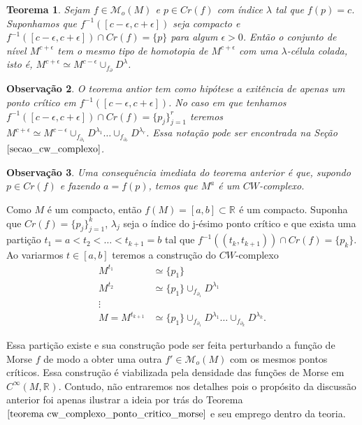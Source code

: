 \documentclass[12pt]{book}
\newtheorem{teorema}{Teorema}[section]
\newtheorem{observacao}[teorema]{Observação}
\newcommand{\funcoesmorse}[1]{\mathcal{M}_{o}(#1)}
\newcommand{\funcoessuaves}[1]{C^{\infty}(#1, \real{})}
\newcommand{\pontoscriticos}[1]{\textit{Cr}(#1)}
\newcommand{\real}[1]{\mathbb{R}^{#1}}
\newcommand{\reta}{\real{}}
\begin{document}
	\begin{teorema}\label{teorema cw_complexo_ponto_critico_morse}
		Sejam $f\in \funcoesmorse{M}$ e $p\in \pontoscriticos{f}$ com índice $\lambda$ tal que $f(p) = c$. Suponhamos que $f^{-1}([c-\epsilon,c+\epsilon])$ seja compacto e $f^{-1}([c-\epsilon,c+\epsilon])\cap \pontoscriticos{f} = \{p\}$ para algum $\epsilon>0$. Então o conjunto de nível $M^{c+\epsilon}$ tem o mesmo tipo de homotopia de $M^{c+\epsilon}$ com uma $\lambda$-célula colada, isto é, $M^{c+\epsilon} \simeq M^{c-\epsilon}\cup_{f_{\partial}} D^{\lambda}$.
	\end{teorema}
	
	\begin{observacao}
		O teorema antior tem como hipótese a exitência de apenas um ponto crítico em $f^{-1}([c-\epsilon,c+\epsilon])$. No caso em que tenhamos $f^{-1}([c-\epsilon,c+\epsilon]) \cap \pontoscriticos{f} = \{p_{j}\}_{j=1}^{r}$ teremos $M^{c+\epsilon} \simeq M^{c-\epsilon}\cup_{f_{\partial_{1}}} D^{\lambda_{1}}\dots  \cup_{f_{\partial_{r}}} D^{\lambda_{r}}$. Essa notação pode ser encontrada na Seção $\ref{secao_cw_complexo}$.
	\end{observacao}
	
	\begin{observacao}
		Uma consequência imediata do teorema anterior é que, supondo $p \in \pontoscriticos{f}$ e fazendo $a = f(p)$, temos que $M^{a}$ é um $CW$-complexo. 
	\end{observacao}
	
	Como $M$ é um compacto, então $f(M) = [a,b] \subset \reta$ é um compacto. Suponha que $\pontoscriticos{f} = \{p_{j}\}_{j=1}^{k}$, $\lambda_{j}$ seja o índice do j-ésimo ponto crítico e que exista uma partição $t_{1} = a < t_{2}< \dots< t_{k+1} = b$ tal que $f^{-1}((t_{k}, t_{k+1})) \cap \pontoscriticos{f} = \{p_{k}\}$. Ao variarmos $t \in [a,b]$ teremos a construção do $CW$-complexo
	$$
	\begin{aligned}
	M^{t_{1}} &\simeq \{p_{1}\}
	\\
	M^{t_{2}} & \simeq \{p_{1}\} \cup_{f_{\partial_{1}}} D^{\lambda_{1}}
	\\
	\vdots&
	\\
	M = M^{t_{k+1}} &\simeq\{p_{1}\} \cup_{f_{\partial_{1}}} D^{\lambda_{1}}\dots  \cup_{f_{\partial_{k}}} D^{\lambda_{k}}.
	\end{aligned}
	$$
	
	Essa partição existe e sua construção pode ser feita perturbando  a função de Morse $f$ de modo a obter uma outra $f' \in \funcoesmorse{M}$ com os mesmos pontos críticos. Essa construção é viabilizada pela densidade das funções de Morse em $\funcoessuaves{M}$. Contudo, não entraremos nos detalhes pois o propósito da discussão anterior foi apenas ilustrar a ideia por trás do Teorema $\ref{teorema cw_complexo_ponto_critico_morse}$ e seu emprego dentro da teoria.
	
\end{document}
